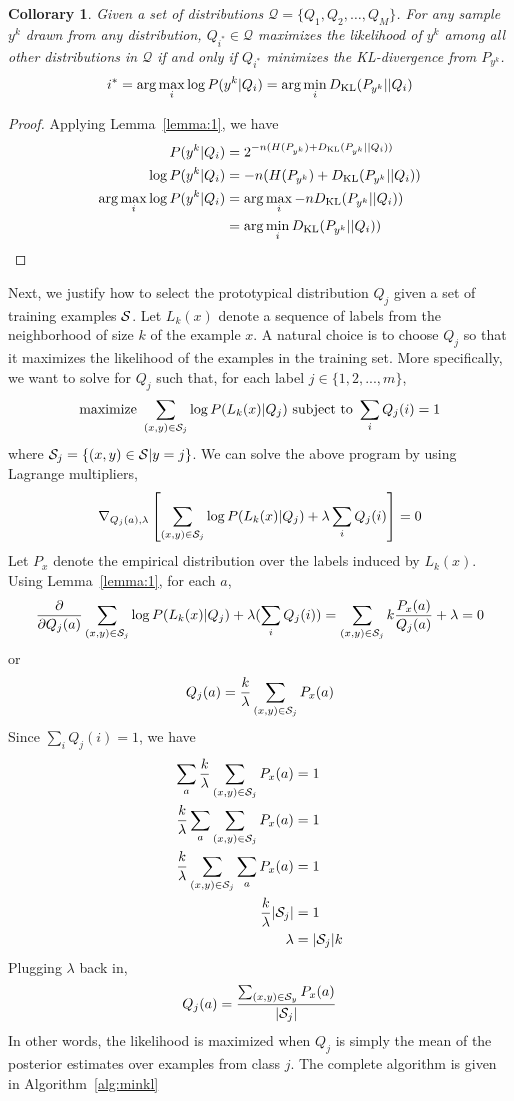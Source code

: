 \documentclass{article}
\newtheorem{collorary}[theorem]{Collorary}
\begin{document}
\begin{collorary}
\label{col:min_dkl}
Given a set of distributions $\mathcal{Q} = \{Q_1, Q_2, \ldots,
Q_{M}\}$. For any sample $y^k$ drawn from any distribution, $Q_{i^*}
\in \mathcal{Q}$ maximizes the likelihood of $y^k$ among all other
distributions in $\mathcal{Q}$ if and only if $Q_{i^*}$ minimizes the
KL-divergence from $P_{y^k}$.
\[
 i^* = \arg\max_i \log P(y^k|Q_i) = \arg\min_i D_{\mathrm{KL}}(P_{y^k}||Q_i)
\]
\end{collorary}
\begin{proof}
  Applying Lemma~\ref{lemma:1}, we have
  \begin{align*}
    P(y^k|Q_i) &= 2^{-n(H(P_{y^k}) + D_{\mathrm{KL}}(P_{y^k} || Q_i))}\\
    \log P(y^k|Q_i) &= -n(H(P_{y^k}) + D_{\mathrm{KL}}(P_{y^k} || Q_i))\\
    \arg\max_i \log P(y^k|Q_i) &= \arg\max_i - nD_{\mathrm{KL}}(P_{y^k} || Q_i))\\ 
    &= \arg\min_i D_{\mathrm{KL}}(P_{y^k} || Q_i))\\
  \end{align*}
\end{proof}

Next, we justify how to select the prototypical distribution $Q_j$
given a set of training examples $\mathcal{S}$. Let $L_k(x)$ denote a sequence
of labels from the neighborhood of size $k$ of the example $x$. A
natural choice is to choose $Q_j$ so that it maximizes the likelihood
of the examples in the training set. More specifically, we want to
solve for $Q_j$ such that, for each label $j \in \{1,2,...,m\}$,
\[
\mbox{maximize } \sum_{(x,y) \in \mathcal{S}_j} \log P(L_k(x)|Q_j) \mbox{ subject to } \sum_{i} Q_j(i) = 1 
\]
where $\mathcal{S}_j = \{ (x,y) \in \mathcal{S} | y = j\}$. We can solve the above program by using Lagrange multipliers,
\[
\nabla_{Q_j(a),\lambda} \left[ \sum_{(x,y) \in \mathcal{S}_j} \log P(L_k(x)|Q_j) + \lambda \sum_{i} Q_j(i) \right] = 0
\]
Let $P_x$ denote the empirical distribution over the labels induced by
$L_k(x)$. Using Lemma~\ref{lemma:1}, for each $a$,
\[
\frac{\partial}{\partial Q_j(a)} \sum_{(x,y) \in \mathcal{S}_j} \log P(L_k(x)|Q_j) + \lambda
(\sum_{i} Q_j(i)) = \sum_{(x,y) \in \mathcal{S}_j} k \frac{P_x(a)}{Q_j(a)} + \lambda = 0
\]
or
\[
Q_j(a) = \frac{k}{\lambda} \sum_{(x,y) \in \mathcal{S}_j} P_x(a)
\]
Since $\sum_{i} Q_j(i) = 1$, we have
\begin{align*}
\sum_{a} \frac{k}{\lambda} \sum_{(x,y) \in \mathcal{S}_j} P_x(a) &= 1\\
\frac{k}{\lambda} \sum_{a} \sum_{(x,y) \in \mathcal{S}_j} P_x(a) &= 1\\
\frac{k}{\lambda} \sum_{(x,y) \in \mathcal{S}_j} \sum_{a} P_x(a) &= 1\\
\frac{k}{\lambda} |\mathcal{S}_j| &= 1\\
\lambda &= |\mathcal{S}_j|k\\
\end{align*}
Plugging $\lambda$ back in,
\[
Q_j(a) = \frac{\sum_{(x,y) \in \mathcal{S}_y} P_x(a)}{|\mathcal{S}_j|}
\]
In other words, the likelihood is maximized when $Q_j$ is simply the
mean of the posterior estimates over examples from class $j$. The
complete algorithm is given in Algorithm~\ref{alg:minkl}
\end{document}
